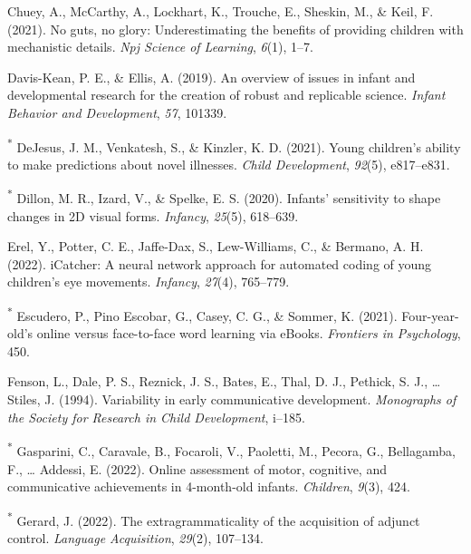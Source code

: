 \documentclass[
  man,floatsintext]{apa6}
\newlength{\cslhangindent}
\newlength{\cslentryspacingunit} %
\newenvironment{CSLReferences}[2] %
 {%
  \setlength{\parindent}{0pt}
  \ifodd #1
  \let\oldpar\par
  \def\par{\hangindent=\cslhangindent\oldpar}
  \fi
  \setlength{\parskip}{#2\cslentryspacingunit}
 }%
 {}
\begin{document}
\begin{CSLReferences}{1}{0}
\leavevmode{}%
Chuey, A., McCarthy, A., Lockhart, K., Trouche, E., Sheskin, M., \& Keil, F. (2021). No guts, no glory: Underestimating the benefits of providing children with mechanistic details. \emph{Npj Science of Learning}, \emph{6}(1), 1--7.

\leavevmode{}%
Davis-Kean, P. E., \& Ellis, A. (2019). An overview of issues in infant and developmental research for the creation of robust and replicable science. \emph{Infant Behavior and Development}, \emph{57}, 101339.

\leavevmode{}%
\textsuperscript{*} DeJesus, J. M., Venkatesh, S., \& Kinzler, K. D. (2021). Young children's ability to make predictions about novel illnesses. \emph{Child Development}, \emph{92}(5), e817--e831.

\leavevmode{}%
\textsuperscript{*} Dillon, M. R., Izard, V., \& Spelke, E. S. (2020). Infants' sensitivity to shape changes in 2D visual forms. \emph{Infancy}, \emph{25}(5), 618--639.

\leavevmode{}%
Erel, Y., Potter, C. E., Jaffe-Dax, S., Lew-Williams, C., \& Bermano, A. H. (2022). iCatcher: A neural network approach for automated coding of young children's eye movements. \emph{Infancy}, \emph{27}(4), 765--779.

\leavevmode{}%
\textsuperscript{*} Escudero, P., Pino Escobar, G., Casey, C. G., \& Sommer, K. (2021). Four-year-old's online versus face-to-face word learning via eBooks. \emph{Frontiers in Psychology}, 450.

\leavevmode{}%
Fenson, L., Dale, P. S., Reznick, J. S., Bates, E., Thal, D. J., Pethick, S. J., \ldots{} Stiles, J. (1994). Variability in early communicative development. \emph{Monographs of the Society for Research in Child Development}, i--185.

\leavevmode{}%
\textsuperscript{*} Gasparini, C., Caravale, B., Focaroli, V., Paoletti, M., Pecora, G., Bellagamba, F., \ldots{} Addessi, E. (2022). Online assessment of motor, cognitive, and communicative achievements in 4-month-old infants. \emph{Children}, \emph{9}(3), 424.

\leavevmode{}%
\textsuperscript{*} Gerard, J. (2022). The extragrammaticality of the acquisition of adjunct control. \emph{Language Acquisition}, \emph{29}(2), 107--134.


\end{CSLReferences}
\end{document}
